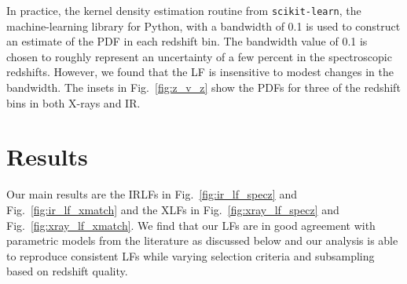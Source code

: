 \documentclass[twocolumn, trackchanges]{aastex63}
\newcommand{\jr}[1]{{\color{purple}[JR: #1]}}
\begin{document}
In practice, the kernel density estimation routine from \texttt{scikit-learn}, the machine-learning library for Python, with a bandwidth of 0.1 is used to construct an estimate of the PDF in each redshift bin.
The bandwidth value of 0.1 is chosen to roughly represent an uncertainty of a few percent in the spectroscopic redshifts.
However, we found that the LF is insensitive to modest changes in the bandwidth.
The insets in Fig.~\ref{fig:z_v_z} show the PDFs for three of the redshift bins in both X-rays and IR.

\section{Results}
\label{sec:results}
Our main results are the IRLFs in Fig.~\ref{fig:ir_lf_specz} and Fig.~\ref{fig:ir_lf_xmatch} and the XLFs in Fig.~\ref{fig:xray_lf_specz} and Fig.~\ref{fig:xray_lf_xmatch}.
We find that our LFs are in good agreement with parametric models from the literature \citep{lacy_spitzer_2015, aird_evolution_2010, ranalli_210_2016} as discussed below and our analysis is able to reproduce consistent LFs while varying selection criteria and subsampling based on redshift quality.
\end{document}
